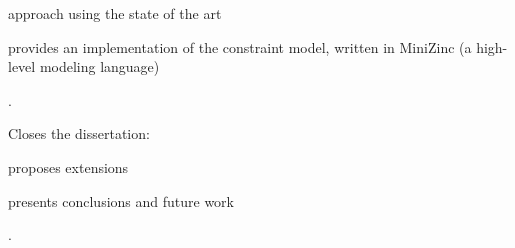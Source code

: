 \begin{description}
\begin{inlinelist}[itemjoin={; }, itemjoin*={; and}]
        approach using the state of the art
      \item {} provides an implementation of
        the \gls{constraint model}, written in \gls{MiniZinc} (a high-level
        modeling language)
    \end{inlinelist}.
  \item[Ending]
    Closes the dissertation:
    \begin{inlinelist}[itemjoin={; }, itemjoin*={; and}]
    \item {} proposes
       extensions
      \item {} presents conclusions and
        future work
    \end{inlinelist}.
\end{description}
